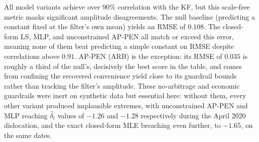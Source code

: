 \documentclass[11pt, a4paper]{article}
\begin{document}
\begin{table}[h!]
\centering
\caption{Recovered $\hat\delta_t$ against the KF benchmark on real
WTI, common dates (2015-01-05 to 2026-02-19). Correlation/RMSE are against the
KF-filtered path; range/mean/std describe each method's own recovered
series in isolation.}
\label{tab:real_kalman_comparison}
\end{table}

All model variants achieve over 90\% correlation with the KF, but this scale-free metric masks significant amplitude disagreements. The null baseline (predicting a constant fixed at the filter's own mean) yields an RMSE of $0.108$. The closed-form LS, MLP, and unconstrained AP-PEN all match or exceed this error, meaning none of them beat predicting a simple constant on RMSE despite correlations above $0.91$. AP-PEN (ARB) is the exception: its RMSE of $0.035$ is roughly a third of the null's, decisively the best score in the table, and comes from confining the recovered convenience yield close to its guardrail bounds rather than tracking the filter's amplitude. These no-arbitrage and economic guardrails were inert on synthetic data but essential here: without them, every other variant produced implausible extremes, with unconstrained AP-PEN and MLP reaching $\hat{\delta}_t$ values of $-1.26$ and $-1.28$ respectively during the April 2020 dislocation, and the exact closed-form MLE breaching even further, to $-1.65$, on the same dates.
\end{document}
